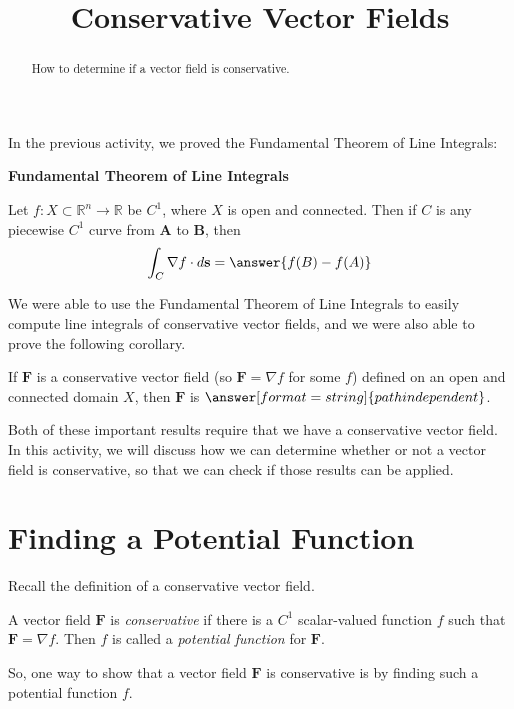 \documentclass{ximera}
\title{Conservative Vector Fields}
\begin{document}
  
\begin{abstract}  
How to determine if a vector field is conservative.
\end{abstract}  
\maketitle  

In the previous activity, we proved the Fundamental Theorem of Line Integrals:

\begin{theorem}
\textbf{Fundamental Theorem of Line Integrals}

Let $f:X\subset \mathbb{R}^n\rightarrow \mathbb{R}$ be $C^1$, where $X$ is open and connected. Then if $C$ is any piecewise $C^1$ curve from $\textbf{A}$ to $\textbf{B}$, then
\[
\int_C\nabla f\cdot d\textbf{s} = \answer{f(B)-f(A)}
\]
\end{theorem}

We were able to use the Fundamental Theorem of Line Integrals to easily compute line integrals of conservative vector fields, and we were also able to prove the following corollary.

\begin{corollary}
If $\textbf{F}$ is a conservative vector field (so $\textbf{F}=\nabla f$ for some $f$) defined on an open and connected domain $X$, then $\textbf{F}$ is $\answer[format=string]{path independent}$.
\end{corollary}

Both of these important results require that we have a conservative vector field. In this activity, we will discuss how we can determine whether or not a vector field is conservative, so that we can check if those results can be applied.

\section{Finding a Potential Function}

Recall the definition of a conservative vector field.

\begin{definition}
A vector field $\mathbf{F}$ is \emph{conservative} if there is a $C^1$ scalar-valued function $f$ such that $\mathbf{F}=\nabla f$. Then $f$ is called a \emph{potential function} for $\mathbf{F}$.
\end{definition}

So, one way to show that a vector field $\mathbf{F}$ is conservative is by finding such a potential function $f$.
\end{document}
